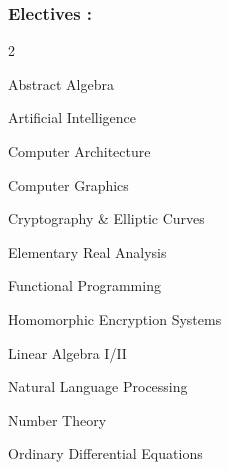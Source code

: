 \documentclass{article}
\newenvironment{mylist}[2]{
  \subsubsection*{#1}
  \begin{multicols}{#2}
  \small
  \begin{list}{}{}
   \setlength{\topsep}{0pt}
   \setlength{\itemsep}{1pt}
   \setlength{\parskip}{0pt}
   \setlength{\parsep}{0pt}}{\end{list}\end{multicols}\normalsize}
\begin{document}
\begin{comment}
\begin{mylist}{Courses :}{2}
\item Unix Software Development
\item Windows Software Development
\item Operating Systems
\item Computer Networks
\item Software Project Requirements Analysis
\item Software Project Design
\item Software Project Implementation
\item Analysis of Algorithms
\item Linear/Non-Linear Data Structures
\item Discrete Structures
\item Formal Languages/Automata
\item Programming Languages
\item Concurrent Programming
\item Computer Organization I/II
\item Probability and Statistical Inference
\item Object-Oriented Programming in C++
\end{mylist}
\end{comment}

\begin{mylist}{Electives :}{2}
\item Abstract Algebra
\item Artificial Intelligence
\item Computer Architecture
\item Computer Graphics
\item Cryptography \& Elliptic Curves
\item Elementary Real Analysis
\item Functional Programming
\item Homomorphic Encryption Systems
\item Linear Algebra I/II
\item Natural Language Processing
\item Number Theory
\item Ordinary Differential Equations
\end{mylist}
\end{document}
